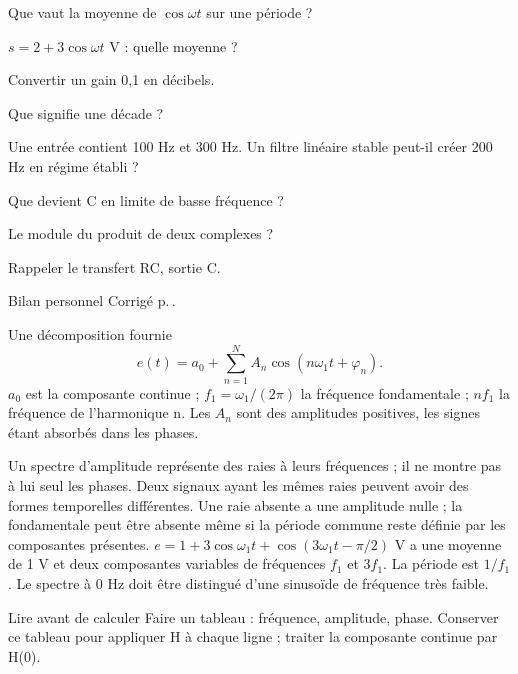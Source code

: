 \begin{questions}
\item Que vaut la moyenne de $\cos\omega t$ sur une période ?
\item $s=2+3\cos\omega t$ V : quelle moyenne ?
\item Convertir un gain 0,1 en décibels.
\item Que signifie une décade ?
\item Une entrée contient 100 Hz et 300 Hz. Un filtre linéaire stable peut-il créer 200 Hz en régime établi ?
\item Que devient C en limite de basse fréquence ?
\item Le module du produit de deux complexes ?
\item Rappeler le transfert RC, sortie C.
\end{questions}
\begin{docu}{Bilan personnel}
Corrigé p.\,\pageref{corr-diag}.
\end{docu}


\begin{loi}{Une décomposition fournie}
\[e(t)=a_0+\sum_{n=1}^{N}A_n\cos(n\omega_1t+\varphi_n).\]$a_0$ est la composante continue ; $f_1=\omega_1/(2\pi)$ la fréquence fondamentale ; $nf_1$ la fréquence de l’harmonique n. Les $A_n$ sont des amplitudes positives, les signes étant absorbés dans les phases.
\end{loi}
Un spectre d’amplitude représente des raies à leurs fréquences ; il ne montre pas à lui seul les phases. Deux signaux ayant les mêmes raies peuvent avoir des formes temporelles différentes. Une raie absente a une amplitude nulle ; la fondamentale peut être absente même si la période commune reste définie par les composantes présentes.
$e=1+3\cos\omega_1t+\cos(3\omega_1t-\pi/2)$ V a une moyenne de 1 V et deux composantes variables de fréquences $f_1$ et $3f_1$. La période est $1/f_1$. Le spectre à 0 Hz doit être distingué d’une sinusoïde de fréquence très faible.
\begin{methode}{Lire avant de calculer}
Faire un tableau : fréquence, amplitude, phase. Conserver ce tableau pour appliquer H à chaque ligne ; traiter la composante continue par H(0).
\end{methode}


